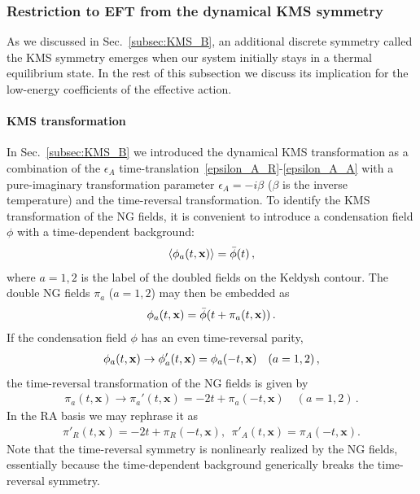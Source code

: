 \documentclass[a4paper,11pt]{article}
\begin{document}
\subsubsection{Restriction to EFT from the dynamical KMS symmetry}
\label{subsec:KMS}



As we discussed in Sec.~\ref{subsec:KMS_B}, an additional discrete symmetry called the KMS symmetry emerges when our system initially stays in a thermal equilibrium state. In the rest of this subsection we discuss its implication for the low-energy coefficients of the effective action.


\paragraph{KMS transformation}




\medskip
In Sec.~\ref{subsec:KMS_B} we introduced the dynamical KMS transformation as
a combination of the $\epsilon_A$ time-translation~\eqref{epsilon_A_R}-\eqref{epsilon_A_A} with a pure-imaginary transformation parameter $\epsilon_A=-i\beta$ ($\beta$ is the inverse temperature) and the time-reversal transformation. To identify the KMS transformation of the NG fields, it is convenient to introduce a condensation field $\phi$ with a time-dependent background:
\begin{align}
\langle\phi_a(t,{\bf x})\rangle=\bar{\phi}(t)\,,
\end{align}
where $a=1,2$ is the label of the doubled fields on the Keldysh contour. The double NG fields $\pi_a$ ($a=1,2$) may then be embedded as
\begin{align}
\phi_a(t,{\bf x})=\bar\phi(t+\pi_a(t,\mathbf x))\,.
\end{align}
If the condensation field $\phi$ has an even time-reversal parity,
\begin{align}
\phi_a(t,{\bf x})\to\phi_a'(t,{\bf x})=\phi_a(-t,{\bf x})
\quad
(a=1,2)\,,
\label{ota}
\end{align}
the time-reversal transformation of the NG fields is given by
\begin{align}
\pi_a(t,\mathbf x)\to \pi_a'(t,\mathbf x) = -2t+\pi_a(-t,\mathbf x)\quad
(a=1,2)\,.
\end{align}
In the RA basis we may rephrase it as
\begin{align}
    \pi'_R(t,\mathbf x)=-2t+\pi_R(-t,\mathbf x),~~
        \pi'_A(t,\mathbf x)=\pi_A(-t,\mathbf x).
        \label{time:rev}
\end{align}
Note that the time-reversal symmetry is nonlinearly realized by the NG fields, essentially because the time-dependent background generically breaks the time-reversal symmetry.
\end{document}
